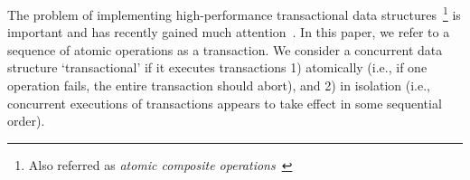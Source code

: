 \documentclass[10pt,conference,compsocconf]{IEEEtran}
\begin{document}
The problem of implementing high-performance transactional data structures~\footnote{Also referred as \emph{atomic composite operations}~\cite{golan2013concurrent}} is important and has recently gained much attention~\cite{golan2013concurrent,bronson2010transactional,herlihy2008transactional,gramoli2013composing,golan2015automatic,hassan2014integrating,koskinen2010coarse}. 
In this paper, we refer to a sequence of atomic operations as a transaction.
We consider a concurrent data structure `transactional' if it executes transactions 1) atomically (i.e., if one operation fails, the entire transaction should abort), and 2) in isolation (i.e., concurrent executions of transactions appears to take effect in some sequential order).
\end{document}
